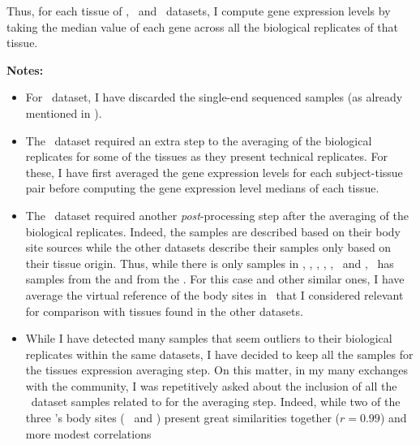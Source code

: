 Thus, for each tissue of \vt, \uhlen\ and \gtex\ datasets, I compute gene
expression levels by taking the median value of each gene across all the
biological replicates of that tissue.



\textbf{Notes:}
\begin{itemize}[topsep=0pt,nosep]
        \item For \ibm\ dataset, I have discarded the single-end sequenced samples
            (as already mentioned in ).
        \item The \uhlen\ dataset required an extra  step to
            the averaging of the biological replicates
            for some of the tissues as they present technical replicates.
            For these, I have first averaged the gene expression levels
            for each subject-tissue pair before computing
            the gene expression level medians of each tissue.
        \item The \gtex\ dataset required another \emph{post}-processing
            step after the averaging of the biological replicates.
            Indeed, the samples are described based on their
            body site sources while the other datasets describe their samples
            only based on their tissue origin.
            Thus, while there is only  samples in \castle, \vt,
            \ibm, \uhlen, \cutler, \kuster\ and \pandey,
            \gtex\ has samples from the 
            and from the .
            For this case and other similar ones,
            I have average the virtual reference of the body sites in \gtex\
            that I considered relevant for comparison with tissues found
            in the other datasets.
        \item While I have detected many samples that seem outliers to their
            biological replicates within the same datasets,
            I have decided to keep all the samples for the tissues expression
            averaging step. On this matter,
            in my many exchanges with the community,
            I was repetitively asked about the inclusion of all the \gtex\ dataset samples
            related to \tissue{Oesophagus} for the averaging step.
            Indeed, while two of the three \gtex{}'s body sites
            (\ie\  and )
            present great similarities together ($r = 0.99$) and more modest correlations

\end{itemize}
